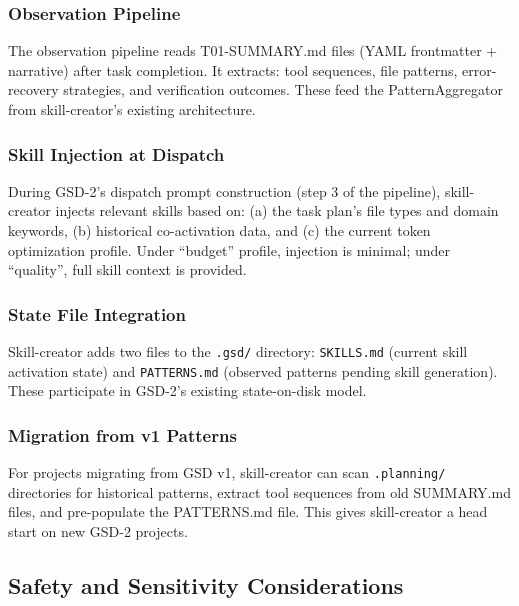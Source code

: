 \documentclass[11pt,letterpaper]{article}
\begin{document}
\subsubsection{Observation Pipeline}

The observation pipeline reads T01-SUMMARY.md files (YAML frontmatter + narrative) after task completion. It extracts: tool sequences, file patterns, error-recovery strategies, and verification outcomes. These feed the PatternAggregator from skill-creator's existing architecture.

\subsubsection{Skill Injection at Dispatch}

During GSD-2's dispatch prompt construction (step 3 of the pipeline), skill-creator injects relevant skills based on: (a) the task plan's file types and domain keywords, (b) historical co-activation data, and (c) the current token optimization profile. Under ``budget'' profile, injection is minimal; under ``quality'', full skill context is provided.

\subsubsection{State File Integration}

Skill-creator adds two files to the \texttt{.gsd/} directory: \texttt{SKILLS.md} (current skill activation state) and \texttt{PATTERNS.md} (observed patterns pending skill generation). These participate in GSD-2's existing state-on-disk model.

\subsubsection{Migration from v1 Patterns}

For projects migrating from GSD v1, skill-creator can scan \texttt{.planning/} directories for historical patterns, extract tool sequences from old SUMMARY.md files, and pre-populate the PATTERNS.md file. This gives skill-creator a head start on new GSD-2 projects.

\subsection{Safety and Sensitivity Considerations}
\end{document}
